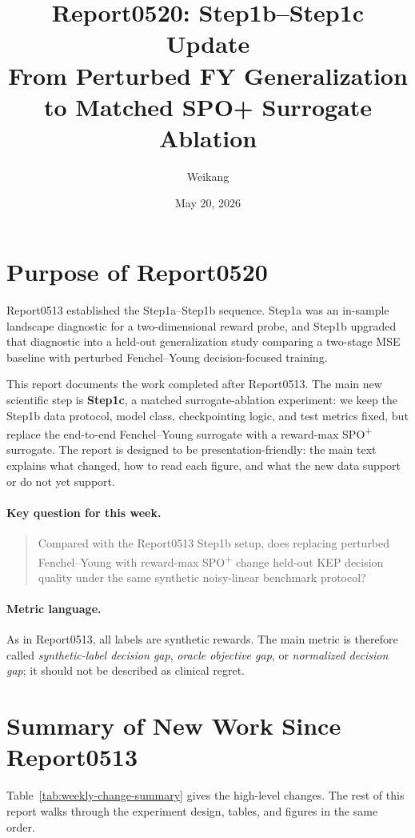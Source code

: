 \documentclass[11pt]{article}
\title{Report0520: Step1b--Step1c Update\\
\large From Perturbed FY Generalization to Matched SPO+ Surrogate Ablation}
\author{Weikang}
\date{May 20, 2026}
\newcommand{\spoplus}{SPO\textsuperscript{+}}
\newcommand{\fy}{Fenchel--Young}
\begin{document}
\maketitle

\section{Purpose of Report0520}

Report0513 established the Step1a--Step1b sequence. Step1a was an in-sample
landscape diagnostic for a two-dimensional reward probe, and Step1b upgraded
that diagnostic into a held-out generalization study comparing a two-stage MSE
baseline with perturbed \fy{} decision-focused training.

This report documents the work completed after Report0513. The main new
scientific step is \textbf{Step1c}, a matched surrogate-ablation experiment:
we keep the Step1b data protocol, model class, checkpointing logic, and test
metrics fixed, but replace the end-to-end \fy{} surrogate with a reward-max
\spoplus{} surrogate. The report is designed to be presentation-friendly: the
main text explains what changed, how to read each figure, and what the new data
support or do not yet support.

\paragraph{Key question for this week.}
\begin{quote}
Compared with the Report0513 Step1b setup, does replacing perturbed \fy{} with
reward-max \spoplus{} change held-out KEP decision quality under the same
synthetic noisy-linear benchmark protocol?
\end{quote}

\paragraph{Metric language.}
As in Report0513, all labels are synthetic rewards. The main metric is therefore
called \emph{synthetic-label decision gap}, \emph{oracle objective gap}, or
\emph{normalized decision gap}; it should not be described as clinical regret.

\section{Summary of New Work Since Report0513}

Table~\ref{tab:weekly-change-summary} gives the high-level changes. The rest of
this report walks through the experiment design, tables, and figures in the same
order.
\end{document}

